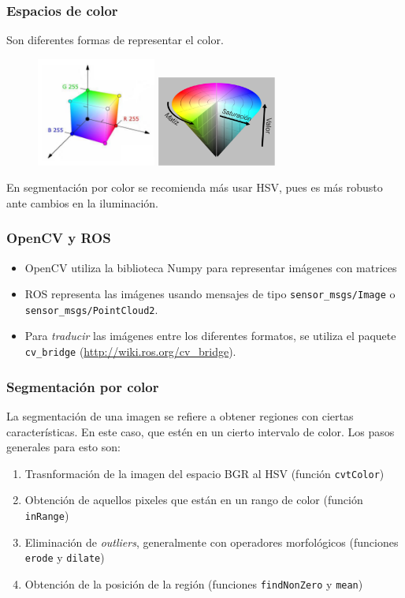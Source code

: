 \documentclass[10pt,spanish,aspectratio=1610]{beamer}
\begin{document}
\begin{frame}\frametitle{Espacios de color}
  Son diferentes formas de representar el color.
  \begin{figure}
    \centering
    \includegraphics[width=0.35\textwidth]{Figures/RGB_model.pdf}
    \includegraphics[width=0.35\textwidth]{Figures/hsv_space.pdf}
  \end{figure}
  En segmentación por color se recomienda más usar HSV, pues es más robusto ante cambios en la iluminación.
\end{frame}

\begin{frame}\frametitle{OpenCV y ROS}
  \begin{itemize}
  \item OpenCV utiliza la biblioteca Numpy para representar imágenes con matrices
  \item ROS representa las imágenes usando mensajes de tipo \texttt{sensor\_msgs/Image} o \texttt{sensor\_msgs/PointCloud2}.
  \item Para \textit{traducir} las imágenes entre los diferentes formatos, se utiliza el paquete \texttt{cv\_bridge} (\url{http://wiki.ros.org/cv_bridge}).
  \end{itemize}
\end{frame}

\begin{frame}\frametitle{Segmentación por color}
  La segmentación de una imagen se refiere a obtener regiones con ciertas características. En este caso, que estén en un cierto intervalo de color. Los pasos generales para esto son:
  \begin{enumerate}
  \item Trasnformación de la imagen del espacio BGR al HSV (función \texttt{cvtColor})
  \item Obtención de aquellos pixeles que están en un rango de color (función \texttt{inRange})
  \item Eliminación de \textit{outliers}, generalmente con operadores morfológicos (funciones \texttt{erode} y \texttt{dilate})
  \item Obtención de la posición de la región (funciones \texttt{findNonZero} y \texttt{mean})
  \end{enumerate}
\end{frame}
\end{document}
